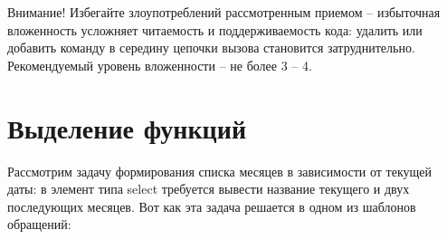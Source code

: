\documentclass[../index.tex]{subfiles}
\begin{document}
Внимание! 
Избегайте злоупотреблений рассмотренным приемом -- избыточная вложенность усложняет читаемость и поддерживаемость кода: удалить или добавить команду в середину цепочки вызова становится затруднительно. Рекомендуемый уровень вложенности -- не более 3 -- 4.
	
\section{Выделение функций}
	
Рассмотрим задачу формирования списка месяцев в зависимости от текущей даты: в элемент типа select требуется вывести название текущего и двух последующих месяцев. Вот как эта задача решается в одном из шаблонов обращений:

\begin{verbatim}


\end{verbatim}
\end{document}

